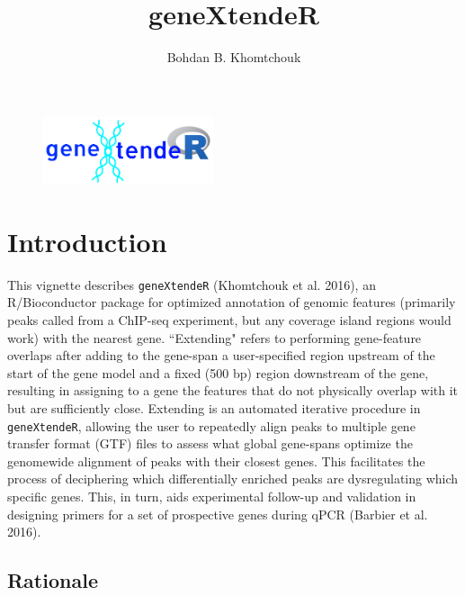 \documentclass[12pt]{article}
\title{geneXtendeR}
\author{Bohdan B. Khomtchouk}
\begin{document}


\maketitle

\begin{figure}[H]
\centering
\includegraphics[width=50mm,scale=0.8]{figures/geneXtendeRlogo.png}
\end{figure}

\section*{Introduction}

This vignette describes \texttt{geneXtendeR} (Khomtchouk et al. 2016), an R/Bioconductor package for optimized annotation of genomic features (primarily peaks called from a ChIP-seq experiment, but any coverage island regions would work) with the nearest gene. ``Extending" refers to performing gene-feature overlaps after adding to the gene-span a user-specified region upstream of the start of the gene model and a fixed (500 bp) region downstream of the gene, resulting in assigning to a gene the features that do not physically overlap with it but are sufficiently close.  Extending is an automated iterative procedure in \texttt{geneXtendeR}, allowing the user to repeatedly align peaks to multiple gene transfer format (GTF) files to assess what global gene-spans optimize the genomewide alignment of peaks with their closest genes.  This facilitates the process of deciphering which differentially enriched peaks are dysregulating which specific genes.  This, in turn, aids experimental follow-up and validation in designing primers for a set of prospective genes during qPCR (Barbier et al. 2016).  

\subsection*{Rationale}
\end{document}
